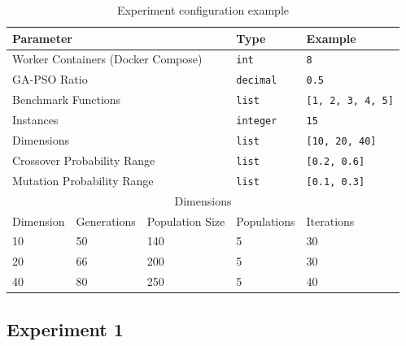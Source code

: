 \documentclass[review]{elsarticle}
\begin{document}
\begin{table}
    \small
    \caption{ Experiment configuration example 
    }
    \label{tab:params}
    \centering
    \small
    \begin{tabular}{|l|l|l|l|l|}
      \hline
      \multicolumn{3}{|l|}{Parameter}                    & Type             & Example         \\ \hline
      \multicolumn{3}{|l|}{Worker Containers (Docker Compose)}        & \texttt{int}     & \texttt{8} \\ \hline
      \multicolumn{3}{|l|}{GA-PSO Ratio}                 & \texttt{decimal} & \texttt{0.5}    \\  \hline
      \multicolumn{3}{|l|}{Benchmark Functions}          & \texttt{list}    & \texttt{[1, 2, 3, 4, 5]} \\ \hline
      \multicolumn{3}{|l|}{Instances}                    & \texttt{integer}    & \texttt{15} \\ \hline
      \multicolumn{3}{|l|}{Dimensions}                   & \texttt{list}    & \texttt{[10, 20, 40]}        \\ \hline
      \multicolumn{3}{|l|}{Crossover Probability Range}  & \texttt{list}    & \texttt{[0.2, 0.6]}      \\ \hline
      \multicolumn{3}{|l|}{Mutation  Probability Range}  & \texttt{list}    & \texttt{[0.1, 0.3]}      \\ \hline
      \multicolumn{5}{|c|}{Dimensions}                                                      \\ \hline  
      Dimension               & Generations & Population Size & Populations  &     Iterations    \\ \hline
              10              & 50      & 140                 &      5                 & 30                \\ \hline
              20              & 66      & 200                 &      5                 & 30               \\ \hline
              40              & 80      & 250                 &      5                 & 40                \\ \hline
    \end{tabular}
\end{table}

\subsection{Experiment 1}
\label{sec:exp1}
\end{document}
